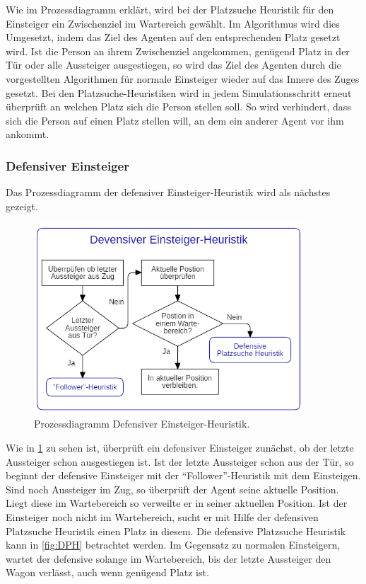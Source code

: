 Wie im Prozessdiagramm erklärt, wird bei der Platzsuche Heuristik für den Einsteiger ein Zwischenziel im Wartereich gewählt. Im Algorithmus wird dies Umgesetzt, indem das Ziel des Agenten auf den entsprechenden Platz gesetzt wird. Ist die Person an ihrem Zwischenziel angekommen, genügend Platz in der Tür oder alle Aussteiger ausgestiegen, so wird das Ziel des Agenten durch die vorgestellten Algorithmen für normale Einsteiger wieder auf das Innere des Zuges gesetzt. Bei den Platzsuche-Heuristiken wird in jedem Simulationsschritt erneut überprüft an welchen Platz sich die Person stellen soll. So wird verhindert, dass sich die Person auf einen Platz stellen will, an dem ein anderer Agent vor ihm ankommt.
\subsubsection{Defensiver Einsteiger}
Das Prozessdiagramm der defensiver Einsteiger-Heuristik wird als nächstes gezeigt.
\begin{figure}[H]
	\centering
		\includegraphics[width=0.9\textwidth]{pictures/model/algorithm/boarding/defensive_boarding/defensive_boarding_heuristic.png}
	\caption{Prozessdiagramm Defensiver Einsteiger-Heuristik.}
	\label{fig:DEH}
\end{figure}
Wie in \figurename \ref{fig:DEH} zu sehen ist, überprüft ein defensiver Einsteiger zunächst, ob der letzte Aussteiger schon ausgestiegen ist.  Ist der letzte Aussteiger schon aus der Tür, so beginnt der defensive Einsteiger mit der "`Follower"'-Heuristik mit dem Einsteigen. Sind noch Aussteiger im Zug, so überprüft der Agent seine aktuelle Position. Liegt diese im Wartebereich so verweilte er in seiner aktuellen Position. Ist der Einsteiger noch nicht im Wartebereich, sucht er mit Hilfe der defensiven Platzsuche Heuristik einen Platz in diesem. Die defensive Platzsuche Heuristik kann in \figurename \ref{fig:DPH} betrachtet werden. Im Gegensatz zu normalen Einsteigern, wartet der defensive solange im Wartebereich, bis der letzte Aussteiger den Wagon verlässt, auch wenn genügend Platz ist. 

